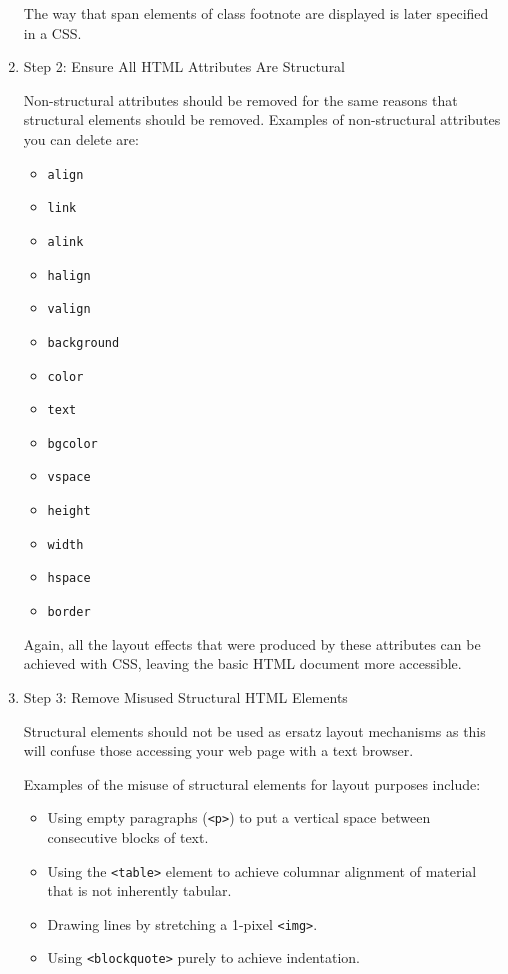\documentclass{article}
\begin{document}
\begin{enumerate}
The way that span elements of class footnote are displayed is later
specified in a CSS.

\item Step 2: Ensure All HTML Attributes Are Structural
\label{sec:orgheadline281}

Non-structural attributes should be removed for the same reasons that
structural elements should be removed. Examples of non-structural
attributes you can delete are:

\begin{itemize}
\item \texttt{align}
\item \texttt{link}
\item \texttt{alink}
\item \texttt{halign}
\item \texttt{valign}
\item \texttt{background}
\item \texttt{color}
\item \texttt{text}
\item \texttt{bgcolor}
\item \texttt{vspace}
\item \texttt{height}
\item \texttt{width}
\item \texttt{hspace}
\item \texttt{border}
\end{itemize}

Again, all the layout effects that were produced by these attributes can
be achieved with CSS, leaving the basic HTML document more accessible.

\item Step 3: Remove Misused Structural HTML Elements
\label{sec:orgheadline282}

Structural elements should not be used as ersatz layout mechanisms as
this will confuse those accessing your web page with a text browser.

Examples of the misuse of structural elements for layout purposes
include:

\begin{itemize}
\item Using empty paragraphs (\texttt{<p>}) to put a vertical space between
consecutive blocks of text.
\item Using the \texttt{<table>} element to achieve columnar alignment of material
that is not inherently tabular.\\
\item Drawing lines by stretching a 1-pixel \texttt{<img>}.
\item Using \texttt{<blockquote>} purely to achieve indentation.
\end{itemize}


\end{enumerate}
\end{document}
